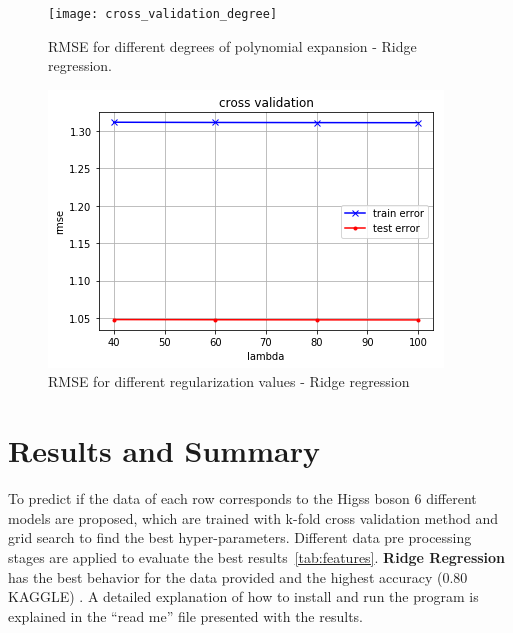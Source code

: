 \documentclass[10pt,conference,compsocconf]{IEEEtran}
\begin{document}
\begin{figure}[H]
  \centering
  \texttt{[image: cross\_validation\_degree]}
  \caption{RMSE for different degrees of polynomial expansion - Ridge regression.}
  \vspace{-3mm}
  \label{fig:best_degree}
\end{figure}


\begin{figure}[H]
  \centering
  \includegraphics[width=\columnwidth]{cross_validation_lambda}
  \caption{RMSE for different regularization values - Ridge regression}
  \vspace{-3mm}
  \label{fig:best_lambda}
\end{figure}



\section{Results and Summary}
To predict if the data of each row corresponds to the Higss boson
6 different models are proposed, which are trained with k-fold cross validation
method and grid search to find the best hyper-parameters. 
Different data pre processing stages are applied to evaluate the best results~\ref{tab:features}. 
\textbf{Ridge Regression} has the best behavior for the data provided and 
the highest accuracy (0.80 KAGGLE) .
A detailed explanation of how to install and run the program is explained
in the ``read me'' file presented with the results.




\end{document}
